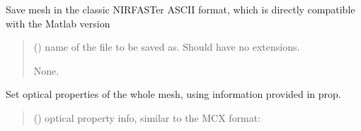 \documentclass[letterpaper,10pt,english]{sphinxmanual}
\begin{document}
\begin{fulllineitems}

\begin{fulllineitems}
\label{\detokenize{_autosummary/nirfasterff.base.dcs_mesh.dcsmesh:nirfasterff.base.dcs_mesh.dcsmesh.save_nirfast}}
\pysigstartsignatures
\pysiglinewithargsret
{}
{}
{}
\pysigstopsignatures
\sphinxAtStartPar
Save mesh in the classic NIRFASTer ASCII format, which is directly compatible with the Matlab version
\begin{quote}\begin{description}
\sphinxAtStartPar
{} () \textendash{} name of the file to be saved as. Should have no extensions.

\sphinxAtStartPar
None.

\end{description}\end{quote}

\end{fulllineitems}


\begin{fulllineitems}
\label{\detokenize{_autosummary/nirfasterff.base.dcs_mesh.dcsmesh:nirfasterff.base.dcs_mesh.dcsmesh.set_prop}}
\pysigstartsignatures
\pysiglinewithargsret
{}
{}
{}
\pysigstopsignatures
\sphinxAtStartPar
Set optical properties of the whole mesh, using information provided in prop.
\begin{quote}\begin{description}
\sphinxAtStartPar
{} () \textendash{} 
\sphinxAtStartPar
optical property info, similar to the MCX format:

\begin{sphinxVerbatim}[commandchars=\\\{\}]
\PYG{p}{[}     \PYG{p}{]}
\PYG{p}{[}     \PYG{p}{]}
\PYG{p}{[}\PYG{p}{]}
\end{sphinxVerbatim}


\end{description}
\end{quote}
\end{fulllineitems}
\end{fulllineitems}
\end{document}
